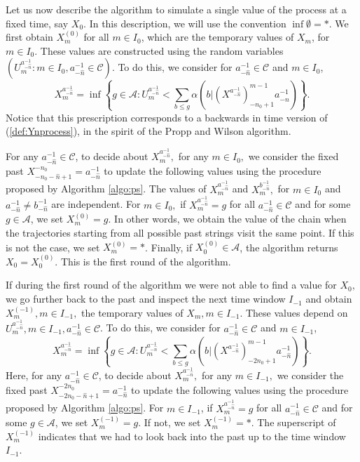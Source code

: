 \documentclass[a4paper]{article}
\newcommand{\A}{\mathcal{A}}
\begin{document}
Let us now describe the algorithm to simulate a single value of the process at a fixed time, say $X_0$. In this description, we will use the convention $\inf\emptyset=*$.
We first obtain $X_{m}^{(0)}$ for all $m\in I_0$, which are the temporary values of $X_{m}$, for $m\in I_0$. These values are constructed using the random variables $(U_{m}^{a_{-\hat{n}}^{-1}}: m \in I_0, a_{-\hat{n}}^{-1} \in \mathcal{C})$. To do this,  we consider for  $a_{-\hat{n}}^{-1} \in \mathcal{C}$ and $m \in I_0$,
$$
X^{a_{-\hat{n}}^{-1}}_{m} =\inf\left\{g\in \A:U_{m}^{a_{-\hat{n}}^{-1}} <\sum_{b\leq g}\alpha(b|(X^{ a_{-\hat{n}}^{-1}})_{-n_0+1}^{m-1}a_{-\hat{n}}^{-1})\right\}.
$$
Notice that this prescription corresponds to a backwards in time version of (\ref{def:Ynprocess}), in the spirit of the Propp and Wilson algorithm. 

For any $a_{-\hat{n}}^{-1} \in \mathcal{C}$, to decide about $X^{a_{-\hat{n}}^{-1}}_{m},$ for any $ m \in I_0, $ we consider the fixed past $X_{-n_0-\hat{n}+1}^{-n_0}=a_{-\hat{n}}^{-1}$ to update the following values using the procedure proposed by Algorithm \ref{algo:ps}. The values of $X^{a_{-\hat{n}}^{-1}}_{m}$ and $X^{b_{-\hat{n}}^{-1}}_{m},$ for $m\in I_0$ and $a_{-\hat{n}}^{-1} \neq b_{-\hat{n}}^{-1}$ are independent.  For $m \in I_0,$ 
if $X^{a_{-\hat{n}}^{-1}}_{m}=g$ for all $a_{-\hat{n}}^{-1} \in \mathcal{C}$ and for some $g\in \A$, we set $X_{m}^{(0)}=g$. 
In other words, we obtain the value of the chain when the trajectories starting from all possible past strings visit the same point. If this is not the case, we set $X_{m}^{(0)}=*$. Finally, 
if $X_{0}^{(0)}\in \A$, the algorithm returns $X_0=X_{0}^{(0)}$. This is the first round of the algorithm. 

If during the first round of the algorithm we were not able to find a value for $X_0,$ we go further back to the past and inspect the next time window $I_{-1}$ and obtain $X_{m}^{(-1)}, m \in I_{-1} ,$  the temporary values of $X_{m}, m \in I_{-1}. $ These values depend on $U_{m}^{a_{-\hat{n}}^{-1}}, m \in I_{-1},  a_{-\hat{n}}^{-1} \in \mathcal{C}$. To do this,  we consider for  $a_{-\hat{n}}^{-1} \in \mathcal{C}$ and $m\in I_{-1}$,
$$
X^{a_{-\hat{n}}^{-1}}_{m} =\inf\left\{g\in \A:U_{m}^{a_{-\hat{n}}^{-1}} <\sum_{b\leq g}\alpha(b|(X^{ a_{-\hat{n}}^{-1}})_{-2n_0+1}^{m-1}a_{-\hat{n}}^{-1})\right\}.
$$
Here, for any $a_{-\hat{n}}^{-1} \in \mathcal{C}$, to decide about $X^{a_{-\hat{n}}^{-1}}_{m}, $ for any $ m\in I_{-1}, $ we consider the fixed past $X_{-2n_0-\hat{n}+1}^{-2n_0}=a_{-\hat{n}}^{-1}$ to update the following values using the procedure proposed by Algorithm \ref{algo:ps}. For $m \in I_{-1}$, if $X^{a_{-\hat{n}}^{-1}}_{m}=g$ for all $a_{-\hat{n}}^{-1} \in \mathcal{C}$ and for some $g\in \A$, we set $X_{m}^{(-1)}=g$. If not, we set $X_{m}^{(-1)}=*$. The superscript of $ X_m^{(-1)} $ indicates that we had to look back into the past up to the time window $ I_{-1}.$ 
\end{document}
